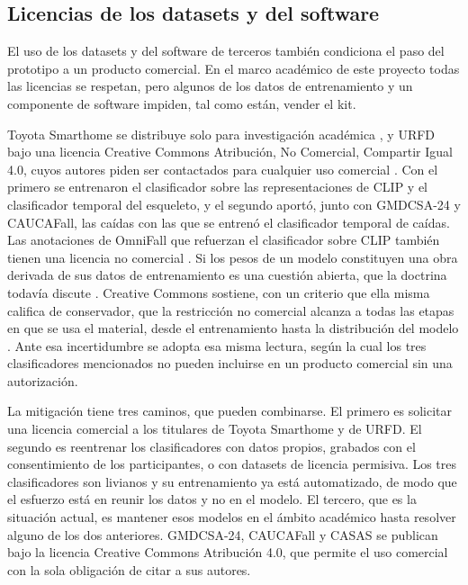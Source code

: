 \subsection{Licencias de los datasets y del software}
\label{sec:licencias}

El uso de los datasets y del software de terceros también condiciona el paso del prototipo a un producto comercial.
En el marco académico de este proyecto todas las licencias se respetan, pero algunos de los datos de entrenamiento y un componente de software impiden, tal como están, vender el kit.

Toyota Smarthome se distribuye solo para investigación académica \parencite{Inria2019}, y URFD bajo una licencia Creative Commons Atribución, No Comercial, Compartir Igual 4.0, cuyos autores piden ser contactados para cualquier uso comercial \parencite{Kepski2014}.
Con el primero se entrenaron el clasificador sobre las representaciones de CLIP y el clasificador temporal del esqueleto, y el segundo aportó, junto con GMDCSA-24 y CAUCAFall, las caídas con las que se entrenó el clasificador temporal de caídas.
Las anotaciones de OmniFall que refuerzan el clasificador sobre CLIP también tienen una licencia no comercial \parencite{OmniFall2025}.
Si los pesos de un modelo constituyen una obra derivada de sus datos de entrenamiento es una cuestión abierta, que la doctrina todavía discute \parencite{Lee2024}.
Creative Commons sostiene, con un criterio que ella misma califica de conservador, que la restricción no comercial alcanza a todas las etapas en que se usa el material, desde el entrenamiento hasta la distribución del modelo \parencite{CreativeCommons2025}.
Ante esa incertidumbre se adopta esa misma lectura, según la cual los tres clasificadores mencionados no pueden incluirse en un producto comercial sin una autorización.

La mitigación tiene tres caminos, que pueden combinarse.
El primero es solicitar una licencia comercial a los titulares de Toyota Smarthome y de URFD.
El segundo es reentrenar los clasificadores con datos propios, grabados con el consentimiento de los participantes, o con datasets de licencia permisiva.
Los tres clasificadores son livianos y su entrenamiento ya está automatizado, de modo que el esfuerzo está en reunir los datos y no en el modelo.
El tercero, que es la situación actual, es mantener esos modelos en el ámbito académico hasta resolver alguno de los dos anteriores.
GMDCSA-24, CAUCAFall y CASAS se publican bajo la licencia Creative Commons Atribución 4.0, que permite el uso comercial con la sola obligación de citar a sus autores.

